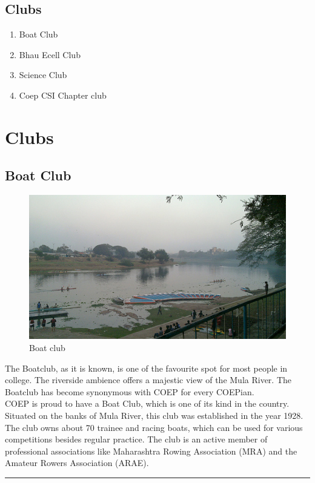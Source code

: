 \documentclass[12pt]{article}
\begin{document}
\subsection{Clubs}
\begin{enumerate}
\item Boat Club
\item Bhau Ecell Club
\item Science Club
\item Coep CSI Chapter club
\end{enumerate}

\section{Clubs}
\hrulefill
\subsection{Boat Club}
\begin{figure}[h]
    \centering
    \includegraphics[scale=0.5]{boatclub}
    \caption{Boat club}
    \label{fig2:boatclub}
\end{figure}
\noindent The Boatclub, as it is known, is one of the favourite spot for most people in college. The riverside ambience offers a majestic view of the Mula River. The Boatclub has become synonymous with COEP for every COEPian.\\
COEP is proud to have a Boat Club, which is one of its kind in the country. Situated on the banks of Mula River, this club was established in the year 1928. The club owns about 70 trainee and racing boats, which can be used for various competitions besides regular practice. The club is an active member of professional associations like Maharashtra Rowing Association (MRA) and the Amateur Rowers Association (ARAE).\\
\hrule
\end{document}
